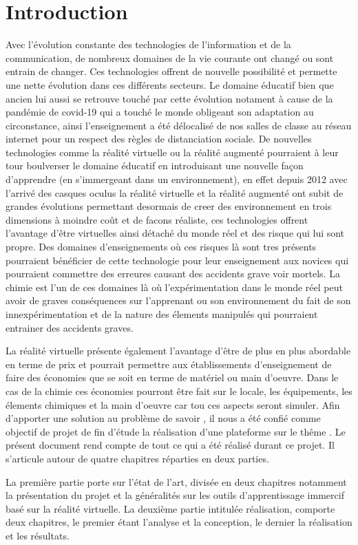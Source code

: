 \chapter*{Introduction}         %

Avec l'évolution constante des technologies de l'information et de la communication, de nombreux domaines de la vie courante ont changé ou sont entrain de changer.
Ces technologies offrent de nouvelle possibilité et permette une nette évolution dans ces différents secteurs.
Le domaine éducatif bien que ancien lui aussi se retrouve touché par cette évolution notament à cause de la pandémie de covid-19 qui a touché le monde obligeant son adaptation au circonstance, ainsi l'enseignement a été délocalisé de nos salles de classe au réseau internet pour un respect des règles de distanciation sociale.
De nouvelles technologies comme la réalité virtuelle ou la réalité augmenté pourraient à leur tour boulverser le domaine éducatif en introduisant une nouvelle façon d'apprendre (en s'immergeant dans un environnement), en effet depuis 2012 avec l'arrivé des casques oculus la réalité virtuelle et la réalité augmenté ont subit de grandes évolutions permettant desormais de creer des environnement en trois dimensions à moindre coût et de facons réaliste, ces technologies offrent l'avantage d'être virtuelles ainsi détaché du monde réel et des risque qui lui sont propre.
Des domaines d'enseignements où ces risques là sont tres présents pourraient bénéficier de cette technologie pour leur enseignement aux novices qui pourraient commettre des erreures causant des accidents grave voir mortels.
La chimie est l'un de ces domaines là où l'expérimentation dans le monde réel peut avoir de graves conséquences sur l'apprenant ou son environnement du fait de son innexpérimentation et de la nature des élements manipulés qui pourraient entrainer des accidents graves.

La réalité virtuelle présente également l'avantage d'être de plus en plus abordable en terme de prix et pourrait permettre aux établissements d'enseignement de faire des économies que se soit en terme de matériel ou main d'oeuvre.
Dans le cas de la chimie ces économies pourront être fait sur le locale, les équipements, les élements chimiques et la main d'oeuvre car tou ces aspects seront simuler.
Afin d'apporter une solution au problème de savoir \og \pb \fg, il nous a été confié comme objectif de projet de fin d'étude la réalisation d'une plateforme sur le thême \og \theme \fg.
Le présent document rend compte de tout ce qui a été réalisé durant ce projet. Il s’articule autour de quatre chapitres réparties en deux parties.

La première partie porte sur l’état de l’art, divisée en deux chapitres notamment la présentation du projet et la généralités sur les outils d'apprentissage immercif basé sur la réalité virtuelle.
La deuxième partie intitulée réalisation, comporte deux chapitres, le premier étant l’analyse et la conception, le dernier la réalisation et les résultats.

